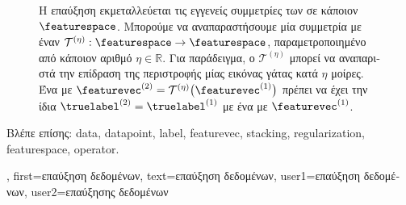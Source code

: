 {{\begin{figure}[H]
\begin{center}
			  \vspace*{-11mm}
		\end{center}
		{
		\caption{\foreignlanguage{greek}{Η επαύξηση}  \foreignlanguage{greek}{εκμεταλλεύεται τις εγγενείς συμμετρίες των} 
			 \foreignlanguage{greek}{σε κάποιον}  $\featurespace$. \foreignlanguage{greek}{Μπορούμε 
			να αναπαραστήσουμε μία συμμετρία με έναν}  $\mathcal{T}^{(\eta)}: \featurespace \rightarrow \featurespace$,
		    	\foreignlanguage{greek}{παραμετροποιημένο από κάποιον αριθμό $\eta \in \mathbb{R}$. Για παράδειγμα, ο $\mathcal{T}^{(\eta)}$ 
		    	μπορεί να αναπαριστά την επίδραση της περιστροφής μίας εικόνας γάτας κατά $\eta$ μοίρες. Ένα}  
		    	\foreignlanguage{greek}{με}  $\featurevec^{(2)} = \mathcal{T}^{(\eta)} \big(\featurevec^{(1)} \big)$ 
			\foreignlanguage{greek}{πρέπει να έχει την ίδια}  $\truelabel^{(2)}=\truelabel^{(1)}$ \foreignlanguage{greek}{με ένα} 
			 \foreignlanguage{greek}{με}  $\featurevec^{(1)}$.\label{fig_symmetry_dataaug_dict}} }
		\end{figure}
		\foreignlanguage{greek}{Βλέπε επίσης:} \gls{data}, \gls{datapoint}, \gls{label}, \gls{featurevec}, \gls{stacking}, \gls{regularization}, 
		\gls{featurespace}, \gls{operator}. },
	first={\foreignlanguage{greek}{επαύξηση δεδομένων}},
	text={\foreignlanguage{greek}{επαύξηση δεδομένων}},
	user1={\foreignlanguage{greek}{επαύξηση δεδομένων}}, %
  	user2={\foreignlanguage{greek}{επαύξησης δεδομένων}} %
}

